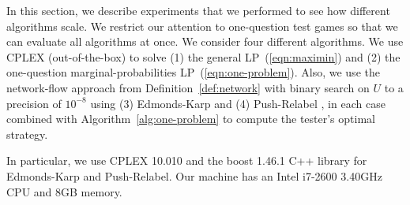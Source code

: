 \documentclass{article}
\begin{document}
In this section, we describe  experiments
that we performed 
 to see how different algorithms scale.
We restrict our attention to one-question test games so that we can evaluate all algorithms at once.
We consider four different algorithms.  We use CPLEX (out-of-the-box)
to solve (1) the general LP~(\ref{eqn:maximin}) and (2) the one-question
marginal-probabilities LP~(\ref{eqn:one-problem}).  Also, we use the
network-flow approach from Definition~\ref{def:network} with binary search
on $U$ to a precision of $10^{-8}$ using (3) Edmonds-Karp \cite{Edmonds:1972} and (4)
Push-Relabel \cite{Goldberg:1988:NAM:48014.61051}, in each case combined with 
Algorithm~\ref{alg:one-problem} to compute the tester's optimal strategy.

In particular, we use CPLEX 10.010 and the boost 1.46.1 C++ library
for Edmonds-Karp and Push-Relabel.
Our machine has an
Intel i7-2600 3.40GHz CPU and 8GB memory.

\end{document}
